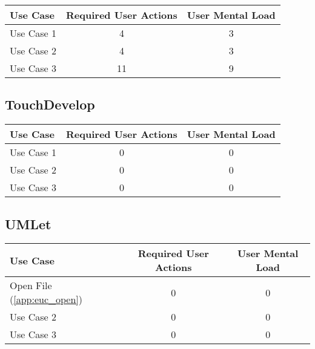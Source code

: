 \begin{tabularx}{\textwidth}{Xcc}
\textbf{Use Case} & \textbf{Required User Actions} & \textbf{User Mental Load}\\
\hline
Use Case 1                          & 4 & 3 \\
Use Case 2                          & 4 & 3 \\
Use Case 3                          & 11 & 9
\end{tabularx}

\subsection*{TouchDevelop}




\begin{tabularx}{\textwidth}{Xcc}
\textbf{Use Case} & \textbf{Required User Actions} & \textbf{User Mental Load}\\
\hline
Use Case 1                          & {\color{red}0} & {\color{red}0} \\
Use Case 2                          & {\color{red}0} & {\color{red}0} \\
Use Case 3                          & {\color{red}0} & {\color{red}0}
\end{tabularx}

\subsection*{UMLet}

\begin{tabularx}{\textwidth}{Xcc}
\textbf{Use Case} & \textbf{Required User Actions} & \textbf{User Mental Load}\\
\hline
Open File (\ref{app:euc_open}) & {\color{red}0} & {\color{red}0} \\
Use Case 2                     & {\color{red}0} & {\color{red}0} \\
Use Case 3                     & {\color{red}0} & {\color{red}0}
\end{tabularx}

